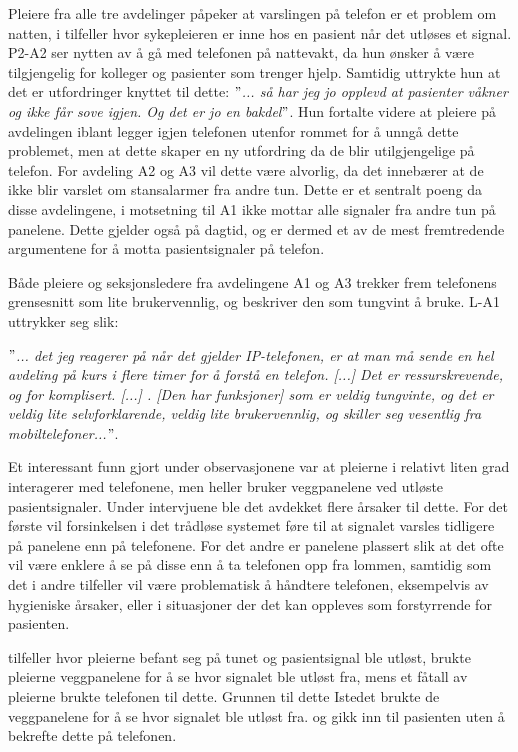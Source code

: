 \noindent
Pleiere fra alle tre avdelinger påpeker at varslingen på telefon er et problem om natten, i tilfeller hvor sykepleieren er inne hos en pasient når det utløses et signal. P2-A2 ser nytten av å gå med telefonen på nattevakt, da hun ønsker å være tilgjengelig for kolleger og pasienter som trenger hjelp. Samtidig uttrykte hun at det er utfordringer knyttet til dette: \textit{ $"$... så har jeg jo opplevd at pasienter våkner og ikke får sove igjen. Og det er jo en bakdel$"$}. Hun fortalte videre at pleiere på avdelingen iblant legger igjen telefonen utenfor rommet for å unngå dette problemet, men at dette skaper en ny utfordring da de blir utilgjengelige på telefon. For avdeling A2 og A3 vil dette være alvorlig, da det innebærer at de ikke blir varslet om stansalarmer fra andre tun. Dette er et sentralt poeng da disse avdelingene, i motsetning til A1 ikke mottar alle signaler fra andre tun på panelene. Dette gjelder også på dagtid, og er dermed et av de mest fremtredende argumentene for å motta pasientsignaler på telefon. 

\noindent
Både pleiere og seksjonsledere fra avdelingene A1 og A3 trekker frem telefonens grensesnitt som lite brukervennlig, og beskriver den som tungvint å bruke. L-A1 uttrykker seg slik:

\noindent
\textit{ $"$... det jeg reagerer på når det gjelder IP-telefonen, er at man må sende en hel avdeling på kurs i flere timer for å forstå en telefon. [...] Det er ressurskrevende, og for komplisert. [...] . [Den har funksjoner] som er veldig tungvinte, og det er veldig lite selvforklarende, veldig lite brukervennlig, og skiller seg vesentlig fra mobiltelefoner...$"$}.

\noindent
Et interessant funn gjort under observasjonene var at pleierne i relativt liten grad interagerer med telefonene, men heller bruker veggpanelene ved utløste pasientsignaler. 
Under intervjuene ble det avdekket flere årsaker til dette. For det første vil forsinkelsen i det trådløse systemet føre til at signalet varsles tidligere på panelene enn på telefonene. For det andre er panelene plassert slik at det ofte vil være enklere å se på disse enn å ta telefonen opp fra lommen, samtidig som det i andre tilfeller vil være problematisk å håndtere telefonen, eksempelvis av hygieniske årsaker, eller i situasjoner der det kan oppleves som forstyrrende for pasienten. 


 tilfeller hvor pleierne befant seg på tunet og pasientsignal ble utløst, brukte pleierne veggpanelene for å se hvor signalet ble utløst fra, mens et fåtall av pleierne brukte telefonen til dette. Grunnen til dette Istedet brukte de veggpanelene for å se hvor signalet ble utløst fra. og gikk inn til pasienten uten å bekrefte dette på telefonen.

